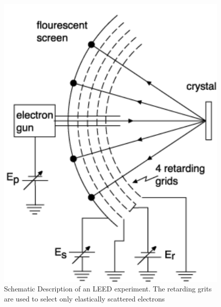 \documentclass[a4paper]{scrartcl}
\numberwithin{equation}{section}
\numberwithin{figure}{section}
\numberwithin{table}{section}
\begin{document}
\begin{figure}
  \centering
   	\includegraphics[width=0.3\linewidth]{pic/leed.pdf}

 \caption{\small Schematic Description of an LEED experiment. The retarding grits are used to select only elastically scattered electrons}
        \label{fig:leed}
\end{figure}



 

\end{document}
